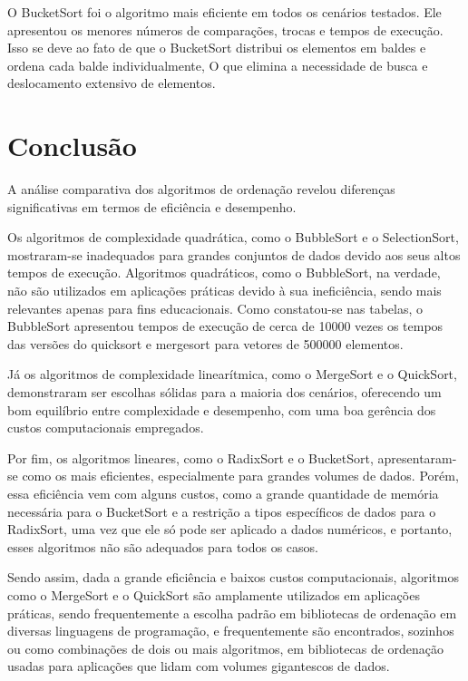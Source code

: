 \documentclass[a4paper, 12pt]{article} %
\begin{document}
O BucketSort foi o algoritmo mais eficiente em todos os cenários testados. Ele apresentou os menores números de comparações,
trocas e tempos de execução. Isso se deve ao fato de que o BucketSort distribui os elementos em baldes e ordena cada balde individualmente,
O que elimina a necessidade de busca e deslocamento extensivo de elementos.

\section{Conclusão}
A análise comparativa dos algoritmos de ordenação revelou diferenças significativas em termos de eficiência e desempenho.

Os algoritmos de complexidade quadrática, como o BubbleSort e o SelectionSort, mostraram-se inadequados para grandes conjuntos de dados devido aos seus altos tempos de execução.
Algoritmos quadráticos, como o BubbleSort, na verdade, não são utilizados em aplicações práticas devido à sua ineficiência, sendo mais relevantes apenas para fins educacionais. Como 
constatou-se nas tabelas, o BubbleSort apresentou tempos de execução de cerca de 10000 vezes os tempos das versões do quicksort e mergesort para vetores de 500000 elementos.

Já os algoritmos de complexidade linearítmica, como o MergeSort e o QuickSort, demonstraram ser escolhas sólidas para a maioria dos cenários, oferecendo um bom equilíbrio entre 
complexidade e desempenho, com uma boa gerência dos custos computacionais empregados.

Por fim, os algoritmos lineares, como o RadixSort e o BucketSort, apresentaram-se como os mais eficientes, especialmente para grandes volumes de dados. Porém, essa eficiência vem com alguns custos,
como a grande quantidade de memória necessária para o BucketSort e a restrição a tipos específicos de dados para o RadixSort, uma vez que ele só pode ser aplicado a dados numéricos, 
e portanto, esses algoritmos não são adequados para todos os casos.

Sendo assim, dada a grande eficiência e baixos custos computacionais, algoritmos como o MergeSort e o QuickSort são amplamente utilizados em aplicações práticas, 
sendo frequentemente a escolha padrão em bibliotecas de ordenação em diversas linguagens de programação, e frequentemente são encontrados, sozinhos 
ou como combinações de dois ou mais algoritmos, em bibliotecas de ordenação usadas para aplicações que lidam com volumes gigantescos de dados.
\end{document}
